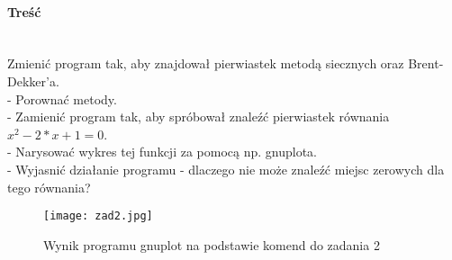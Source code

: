 \paragraph{Treść}~\\
Zmienić program tak, aby znajdował pierwiastek metodą siecznych oraz Brent-Dekker'a.\\
- Porownać metody.\\
- Zamienić program tak, aby spróbował znaleźć pierwiastek równania $ x^2 - 2*x + 1 = 0 $.\\
- Narysować wykres tej funkcji za pomocą np. gnuplota.\\
- Wyjasnić działanie programu - dlaczego nie może znaleźć miejsc zerowych dla tego równania?















\begin{figure}[p]
  \caption{Wynik programu gnuplot na podstawie komend do zadania 2}
  \label{fig:Zad2Jpg}
  \centering
  \texttt{[image: zad2.jpg]}
\end{figure}


